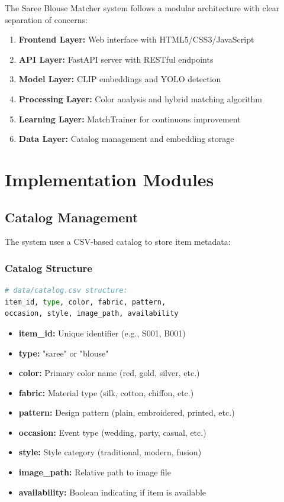 \documentclass[12pt,a4paper]{report}
\begin{document}
The Saree Blouse Matcher system follows a modular architecture with clear separation of concerns:

\begin{enumerate}
    \item \textbf{Frontend Layer:} Web interface with HTML5/CSS3/JavaScript
    \item \textbf{API Layer:} FastAPI server with RESTful endpoints
    \item \textbf{Model Layer:} CLIP embeddings and YOLO detection
    \item \textbf{Processing Layer:} Color analysis and hybrid matching algorithm
    \item \textbf{Learning Layer:} MatchTrainer for continuous improvement
    \item \textbf{Data Layer:} Catalog management and embedding storage
\end{enumerate}

\section{Implementation Modules}

\subsection{Catalog Management}

The system uses a CSV-based catalog to store item metadata:

\subsubsection{Catalog Structure}

\begin{lstlisting}[language=Python]
# data/catalog.csv structure:
item_id, type, color, fabric, pattern, 
occasion, style, image_path, availability
\end{lstlisting}

\begin{itemize}
    \item \textbf{item\_id:} Unique identifier (e.g., S001, B001)
    \item \textbf{type:} "saree" or "blouse"
    \item \textbf{color:} Primary color name (red, gold, silver, etc.)
    \item \textbf{fabric:} Material type (silk, cotton, chiffon, etc.)
    \item \textbf{pattern:} Design pattern (plain, embroidered, printed, etc.)
    \item \textbf{occasion:} Event type (wedding, party, casual, etc.)
    \item \textbf{style:} Style category (traditional, modern, fusion)
    \item \textbf{image\_path:} Relative path to image file
    \item \textbf{availability:} Boolean indicating if item is available
\end{itemize}
\end{document}
